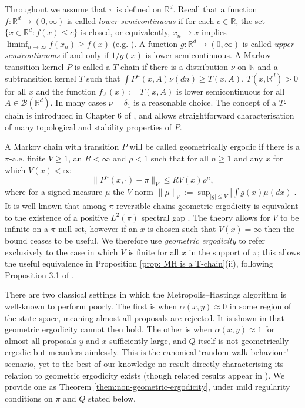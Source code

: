 \documentclass{article}
\theoremstyle{definition}
\theoremstyle{plain}
\begin{document}
Throughout we assume that $\pi$ is defined on $\mathbb{R}^d$.  Recall that a function $f: \mathbb{R}^d \to (0,\infty)$ is called \textit{lower semicontinuous} if for each $c \in \mathbb{R}$, the set $\{x \in \mathbb{R}^d : f(x) \le c\}$ is closed, or equivalently, $x_n\to x$ implies $\liminf_{n\to\infty} f(x_n) \ge f(x)$ (e.g. \cite[Section 2.1]{aliprantis2006infinite}). A function $g:\mathbb{R}^d \to (0,\infty)$ is called \textit{upper semicontinuous} if and only if $1/g(x)$ is lower semicontinuous.  A Markov transition kernel $P$ is called a $T$-chain if there is a distribution $\nu$ on $\mathbb{N}$ and a subtransition kernel $T$ such that $\int P^n(x,A)\nu(dn) \geq T(x,A)$, $T(x,\mathbb{R}^d) > 0$ for all $x$ and the function $f_A(x) := T(x,A)$ is lower semicontinuous for all $A \in \mathcal{B}(\mathbb{R}^d)$. In many cases $\nu = \delta_1$ is a reasonable choice.  The concept of a $T$-chain is introduced in Chapter 6 of \citep{meyn2012markov}, and allows straightforward characterisation of many topological and stability properties of $P$.  

A Markov chain with transition $P$ will be called geometrically ergodic if there is a $\pi$-a.e. finite $V \geq 1$, an $R < \infty$ and $\rho < 1$ such that for all $n \geq 1$ and any $x$ for which $V(x) < \infty$
\begin{equation}
\label{eq:geometric_ergodicity}
\|P^n(x,\cdot) - \pi\|_{V} \leq RV(x)\rho^n,
\end{equation}
where for a signed measure $\mu$ the $V$-norm $\|\mu\|_V := \sup_{|g|\leq V}\left|\int g(x)\mu(dx)\right|$.  It is well-known that among $\pi$-reversible chains geometric ergodicity is equivalent to the existence of a positive $L^2(\pi)$ spectral gap \citep{kontoyiannis2012geometric}.  The theory allows for $V$ to be infinite on a $\pi$-null set, however if an $x$ is chosen such that $V(x) = \infty$ then the bound ceases to be useful.  We therefore use \textit{geometric ergodicity} to refer exclusively to the case in which $V$ is finite for all $x$ in the support of $\pi$; this allows the useful equivalence in Proposition \ref{prop: MH is a T-chain}(ii), following Proposition 3.1 of \citep{roberts1996geometric}.

There are two classical settings in which the Metropolis--Hastings algorithm is well-known to perform poorly. The first is when $\alpha(x,y) \approx 0$ in some region of the state space, meaning almost all proposals are rejected.  It is shown in \cite{roberts1996geometric} that geometric ergodicity cannot then hold.  The other is when $\alpha(x,y) \approx 1$ for almost all proposals $y$ and $x$ sufficiently large, and $Q$ itself is not geometrically ergodic but meanders aimlessly.  This is the canonical `random walk behaviour' scenario, yet to the best of our knowledge no result directly characterising its relation to geometric ergodicity exists (though related results appear in \cite{jarner2003necessary}).  We provide one as Theorem \ref{them:non-geometric-ergodicity}, under mild regularity conditions on $\pi$ and $Q$ stated below.
\end{document}
